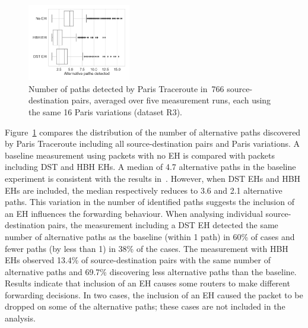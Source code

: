 \documentclass[conference]{IEEEtran}
\begin{document}


\begin{figure}[t]
\centering
  \includegraphics[width=0.4\textwidth]{altpaths.png}
  \caption{Number of paths detected by Paris Traceroute in~766
source-destination pairs, averaged over five measurement runs, each using
the same 16 Paris variations (dataset R3).}
  \label{fig:paths-detected}
\end{figure}



Figure~\ref{fig:paths-detected} compares the distribution of the number of
alternative paths discovered by Paris Traceroute including all
source-destination pairs and Paris variations.  A baseline measurement using packets with no EH
is compared with packets including DST and HBH EHs.  
A median of 4.7 alternative paths in the baseline experiment is consistent with the
results in~\cite{augustin2006avoiding}.  However, when DST EHs and HBH EHs are
included, the median respectively reduces to 3.6 and 2.1 alternative paths.  
This variation in the number of identified paths suggests the inclusion of
an EH influences the forwarding behaviour. 
When analysing individual source-destination pairs, the
measurement including a DST EH detected the same number of alternative paths as the baseline
(within 1 path) in 60\% of cases and fewer paths (by less than 1) in 38\% of
the cases.  The measurement with HBH EHs observed 13.4\%
of source-destination pairs with the same number of alternative paths and
69.7\% discovering less alternative paths than the baseline.
Results indicate that inclusion of an EH causes some routers to make
different forwarding decisions. In two cases, the inclusion of an EH caused the packet to be dropped on some of the alternative paths; these cases are not included in the analysis.
\end{document}
